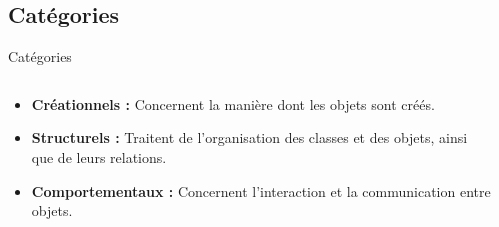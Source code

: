 \documentclass[aspectratio=169]{beamer}
\begin{document}
    \subsection{Catégories}
        \begin{frame}{Catégories}
            \begin{columns}
                \begin{column}{0.5\textwidth}
                    \begin{itemize}
                        \item<2-> \textbf{Créationnels :} Concernent la manière dont les objets sont créés.             
                        \item<3-> \textbf{Structurels :} Traitent de l'organisation des classes et des objets, ainsi que de leurs relations.               
                        \item<4-> \textbf{Comportementaux :} Concernent l'interaction et la communication entre objets.
                    \end{itemize}
                \end{column}
                \begin{column}{0.5\textwidth}
\end{column}
\end{columns}
\end{frame}
\end{document}
